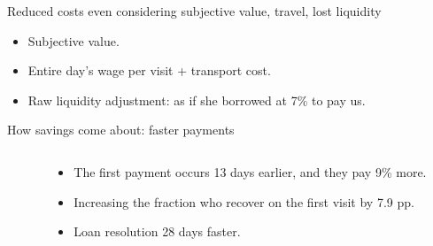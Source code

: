 \documentclass[9pt, aspectratio=169]{beamer}
\begin{document}
\begin{frame}{Reduced costs even considering subjective value, travel, lost liquidity }

\vspace{-.1in}
\begin{itemize}
    \item Subjective value.
    \item Entire day's wage per visit + transport cost.
    \item Raw liquidity adjustment: as if she borrowed at 7\% to pay us.  %
\end{itemize}
\begin{table}[H]
\label{table_robustness_fc}
\begin{center}
\resizebox{0.85\textwidth}{!}{
\small{}
}
\end{center}
 \scriptsize 
\end{table}
\end{frame}


\begin{frame}{How savings come about: faster payments}
\begin{columns}
\begin{column}{.45\textwidth}
\begin{table}[H]
\begin{center}
\scriptsize{}
\end{center}
\end{table}
\end{column}
\begin{column}{.45\textwidth}
   \begin{itemize}
     \item The first payment occurs 13 days earlier, and they pay 9\% more.
     \vspace{.2in}
     \vfill \item Increasing the fraction who recover on the first visit by 7.9 pp. 
     \vspace{.2in}
     \vfill  \item Loan resolution 28 days faster.
\end{itemize} 
\end{column}
\end{columns}
\end{frame}
\end{document}
